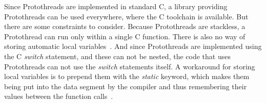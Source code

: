 Since Protothreads are implemented in standard C, a library providing Protothreads can be used everywhere,
where the C toolchain is available.
But there are some constraints to consider.
Because Protothreads are stackless, a Protothread can run only within a single C function.
There is also no way of storing automatic local variables~\cite{contiki-docs}. %
And since Protothreads are implemented using the C {\it switch} statement, and these can %
not be nested, the code that uses Protothreads can not use the {\it switch} statements itself.
A workaround for storing local variables is to prepend them with the {\it static} keyword,
which makes them being put into the data segment
by the compiler and thus remembering their values between the function calls~\cite{paper-protothreads}.

